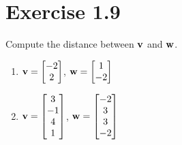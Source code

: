 \section*{Exercise 1.9}
\begin{exercise}
Compute the distance between $\mathbf{v}$ and $\mathbf{w}$.
\begin{enumerate}
  \item $\mathbf{v} = \begin{bmatrix} -2 \\ 2 \end{bmatrix}$,
        $\mathbf{w} = \begin{bmatrix} 1 \\ -2 \end{bmatrix}$
  \item $\mathbf{v} = \begin{bmatrix} 3 \\ -1 \\ 4 \\ 1 \end{bmatrix}$,
        $\mathbf{w} = \begin{bmatrix} -2 \\ 3 \\ 3 \\ -2 \end{bmatrix}$
\end{enumerate}
\end{exercise}

